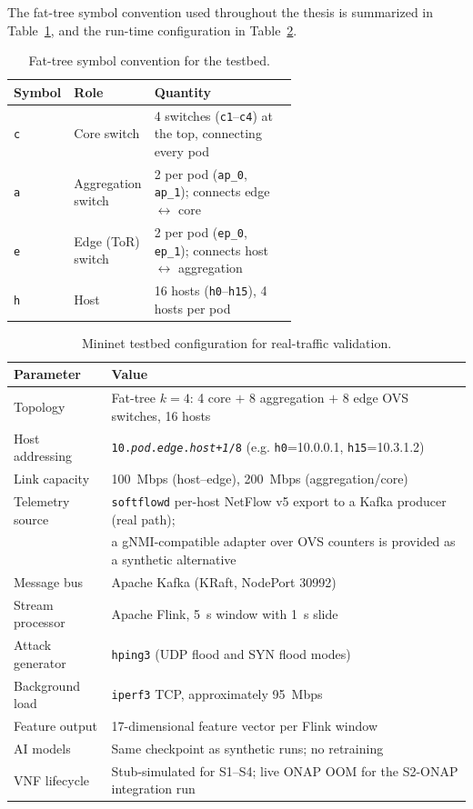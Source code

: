 \documentclass[12pt, a4paper, reqno, oneside]{book}
\begin{document}
The fat-tree symbol convention used throughout the thesis is summarized in
Table~\ref{tab:testbed-fat-tree-legend}, and the run-time configuration in
Table~\ref{tab:mininet-setup}.

\begin{table}[H]
\centering
\small
\caption{Fat-tree symbol convention for the testbed.}
\label{tab:testbed-fat-tree-legend}
\begin{tabular}{@{}llp{0.62\linewidth}@{}}
\toprule
Symbol & Role & Quantity \\
\midrule
\texttt{c}        & Core switch              & 4 switches (\texttt{c1}--\texttt{c4}) at the top, connecting every pod \\
\texttt{a}        & Aggregation switch       & 2 per pod (\texttt{ap\_0}, \texttt{ap\_1}); connects edge $\leftrightarrow$ core \\
\texttt{e}        & Edge (ToR) switch        & 2 per pod (\texttt{ep\_0}, \texttt{ep\_1}); connects host $\leftrightarrow$ aggregation \\
\texttt{h}        & Host                     & 16 hosts (\texttt{h0}--\texttt{h15}), 4 hosts per pod \\
\bottomrule
\end{tabular}
\end{table}

\begin{table}[H]
\centering
\small
\caption{Mininet testbed configuration for real-traffic validation.}
\label{tab:mininet-setup}
\begin{tabular}{@{}ll@{}}
\toprule
Parameter & Value \\
\midrule
Topology         & Fat-tree $k=4$: 4 core $+$ 8 aggregation $+$ 8 edge OVS switches, 16 hosts \\
Host addressing  & \texttt{10.\textit{pod}.\textit{edge}.\textit{host+1}/8} (e.g. \texttt{h0}=10.0.0.1, \texttt{h15}=10.3.1.2) \\
Link capacity    & 100~Mbps (host--edge), 200~Mbps (aggregation/core) \\
Telemetry source & \texttt{softflowd} per-host NetFlow v5 export to a Kafka producer (real path); \\
                 & a gNMI-compatible adapter over OVS counters is provided as a synthetic alternative \\
Message bus      & Apache Kafka (KRaft, NodePort 30992) \\
Stream processor & Apache Flink, 5~s window with 1~s slide \\
Attack generator & \texttt{hping3} (UDP flood and SYN flood modes) \\
Background load  & \texttt{iperf3} TCP, approximately 95~Mbps \\
Feature output   & 17-dimensional feature vector per Flink window \\
AI models        & Same checkpoint as synthetic runs; no retraining \\
VNF lifecycle    & Stub-simulated for S1--S4; live ONAP OOM for the S2-ONAP integration run \\
\bottomrule
\end{tabular}
\end{table}
\end{document}
